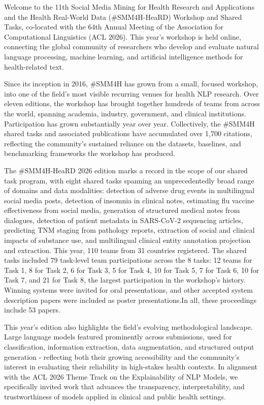 Welcome to the 11th Social Media Mining for Health Research and Applications and the Health Real-World Data (\#SMM4H-HeaRD) Workshop and Shared Tasks, co-located with the 64th Annual Meeting of the Association for Computational Linguistics (ACL 2026). This year’s workshop is held online, connecting the global community of researchers who develop and evaluate natural language processing, machine learning, and artificial intelligence methods for health-related text.
\par\vspace{1em}

Since its inception in 2016, \#SMM4H has grown from a small, focused workshop, into one of the field’s most visible recurring venues for health NLP research. Over eleven editions, the workshop has brought together hundreds of teams from across the world, spanning academia, industry, government, and clinical institutions. Participation has grown substantially year over year. Collectively, the \#SMM4H shared tasks and associated publications have accumulated over 1,700 citations, reflecting the community’s sustained reliance on the datasets, baselines, and benchmarking frameworks the workshop has produced.
\par\vspace{1em}

The \#SMM4H-HeaRD 2026 edition marks a record in the scope of our shared task program, with eight shared tasks spanning an unprecedentedly broad range of domains and data modalities: detection of adverse drug events in multilingual social media posts, detection of insomnia in clinical notes, estimating flu vaccine effectiveness from social media, generation of structured medical notes from dialogues, detection of patient metadata in SARS-CoV-2 sequencing articles, predicting TNM staging from pathology reports, extraction of social and clinical impacts of substance use, and multilingual clinical entity annotation projection and extraction. This year, 110 teams from 31 countries registered. The shared tasks included 79 task-level team participations across the 8 tasks: 12 teams for Task 1, 8 for Task 2, 6 for Task 3, 5 for Task 4, 10 for Task 5, 7 for Task 6, 10 for Task 7, and 21 for Task 8, the largest participation in the workshop's history. Winning systems were invited for oral presentations, and other accepted system description papers were included as poster presentations.In all, these proceedings include 53 papers.

\par\vspace{1em}
This year’s edition also highlights the field’s evolving methodological landscape. Large language models featured prominently across submissions, used for classification, information extraction, data augmentation, and structured output generation - reflecting both their growing accessibility and the community’s interest in evaluating their reliability in high-stakes health contexts. In alignment with the ACL 2026 Theme Track on the Explainability of NLP Models, we specifically invited work that advances the transparency, interpretability, and trustworthiness of models applied in clinical and public health settings.

